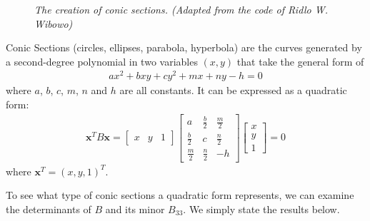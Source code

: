 \begin{figure}[h!]
\caption{\textit{The creation of conic sections. (Adapted from the code of Ridlo W. Wibowo)}}
\label{fig:conicsecs}
\end{figure}
\begin{defn}
\label{defn:conic}
Conic Sections (circles, ellipses, parabola, hyperbola) are the curves generated by a second-degree polynomial in two variables $(x, y)$ that take the general form of
\begin{align}
ax^2 + bxy + cy^2 + mx + ny - h = 0
\end{align}
where $a$, $b$, $c$, $m$, $n$ and $h$ are all constants. It can be expressed as a quadratic form:
\begin{align}
\textbf{x}^T B\textbf{x} = 
\begin{bmatrix}
x & y & 1
\end{bmatrix}
\begin{bmatrix}
a & \frac{b}{2} & \frac{m}{2} \\
\frac{b}{2} & c & \frac{n}{2} \\
\frac{m}{2} & \frac{n}{2} & -h
\end{bmatrix}
\begin{bmatrix}
x \\
y \\
1
\end{bmatrix} = 0
\end{align}
where $\textbf{x}^T = (x,y,1)^T$.
\end{defn}
To see what type of conic sections a quadratic form represents, we can examine the determinants of $B$ and its minor $B_{33}$. We simply state the results below.
